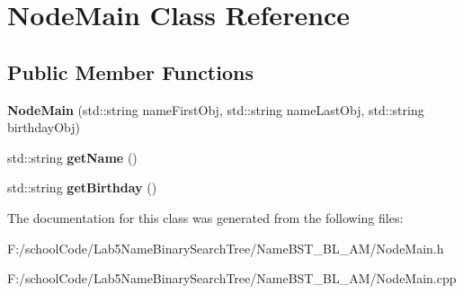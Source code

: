 \hypertarget{class_node_main}{}\section{Node\+Main Class Reference}
\label{class_node_main}
\subsection*{Public Member Functions}
\begin{DoxyCompactItemize}
\item 
\mbox{\label{class_node_main_a61c13db0781ce67d40c980dc5e5167e8}} 
{\bfseries Node\+Main} (std\+::string name\+First\+Obj, std\+::string name\+Last\+Obj, std\+::string birthday\+Obj)
\item 
\mbox{\label{class_node_main_ab2a322039546740a6ee4dc889c1af6ce}} 
std\+::string {\bfseries get\+Name} ()
\item 
\mbox{\label{class_node_main_a92b3f0b8de146421da6067f5272135d8}} 
std\+::string {\bfseries get\+Birthday} ()
\end{DoxyCompactItemize}


The documentation for this class was generated from the following files\+:\begin{DoxyCompactItemize}
\item 
F\+:/school\+Code/\+Lab5\+Name\+Binary\+Search\+Tree/\+Name\+B\+S\+T\+\_\+\+B\+L\+\_\+\+A\+M/Node\+Main.\+h\item 
F\+:/school\+Code/\+Lab5\+Name\+Binary\+Search\+Tree/\+Name\+B\+S\+T\+\_\+\+B\+L\+\_\+\+A\+M/Node\+Main.\+cpp\end{DoxyCompactItemize}
